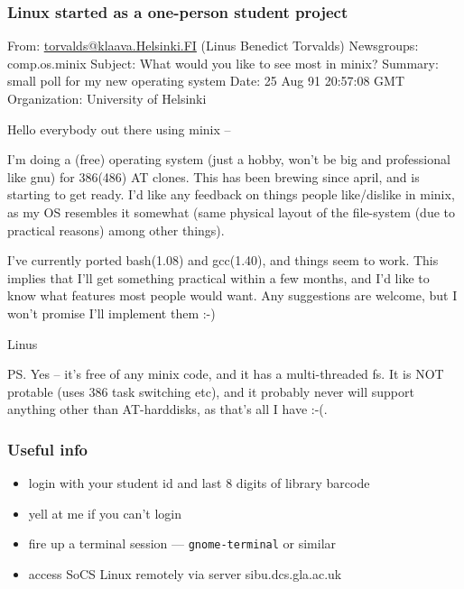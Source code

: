 \documentclass[17pt]{beamer}
\begin{document}
\begin{frame}
\frametitle{Linux started as a one-person student project}
  {\tiny
    From: \url{torvalds@klaava.Helsinki.FI} (Linus Benedict Torvalds)
    Newsgroups: comp.os.minix
    Subject: What would you like to see most in minix?
    Summary: small poll for my new operating system
    Date: 25 Aug 91 20:57:08 GMT
    Organization: University of Helsinki

    Hello everybody out there using minix –

    I’m doing a (free) operating system (just a hobby, won’t be big and
    professional like gnu) for 386(486) AT clones. This has been brewing
    since april, and is starting to get ready. I’d like any feedback on
    things people like/dislike in minix, as my OS resembles it somewhat
    (same physical layout of the file-system (due to practical reasons)
    among other things).

    I’ve currently ported bash(1.08) and gcc(1.40), and things seem to work.
    This implies that I’ll get something practical within a few months, and
    I’d like to know what features most people would want. Any suggestions
    are welcome, but I won’t promise I’ll implement them :-)

    Linus 

    PS. Yes – it’s free of any minix code, and it has a multi-threaded fs.
    It is NOT protable (uses 386 task switching etc), and it probably never
    will support anything other than AT-harddisks, as that’s all I have :-(.

}
\end{frame}


\begin{frame}
  \frametitle{Useful info}
  \begin{itemize}
  \item login with your student id and last 8 digits of library barcode
  \item yell at me if you can't login
    \item fire up a terminal session --- \texttt{gnome-terminal} or similar
  \item access SoCS Linux remotely via server sibu.dcs.gla.ac.uk
  \end{itemize}
\end{frame}
\end{document}
